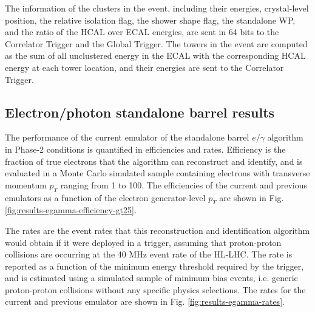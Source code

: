The information of the clusters in the event, including their energies, crystal-level position, the relative isolation flag, the shower shape flag, the standalone WP, and the ratio of the HCAL over ECAL energies, are sent in 64 bits to the Correlator Trigger and the Global Trigger. The towers in the event are computed as the sum of all unclustered energy in the ECAL with the corresponding HCAL energy at each tower location, and their energies are sent to the Correlator Trigger.

\subsection{Electron/photon standalone barrel results}
The performance of the current emulator of the standalone barrel $e/\gamma$ algorithm in Phase-2 conditions is quantified in efficiencies and rates. Efficiency is the fraction of true electrons that the algorithm can reconstruct and identify, and is evaluated in a Monte Carlo simulated sample containing electrons with transverse momentum $p_{T}$ ranging from 1 to 100\GeV.  The efficiencies of the current and previous emulators as a function of the electron generator-level $p_{T}$ are shown in Fig. \ref{fig:results-egamma-efficiency-gt25}. 

The rates are the event rates that this reconstruction and identification algorithm would obtain if it were deployed in a trigger, assuming that proton-proton collisions are occurring at the 40 MHz event rate of the HL-LHC. The rate is reported as a function of the minimum energy threshold required by the trigger, and is estimated using a simulated sample of minimum bias events, i.e. generic proton-proton collisions without any specific physics selections. The rates for the current and previous emulator are shown in Fig. \ref{fig:results-egamma-rates}. 

